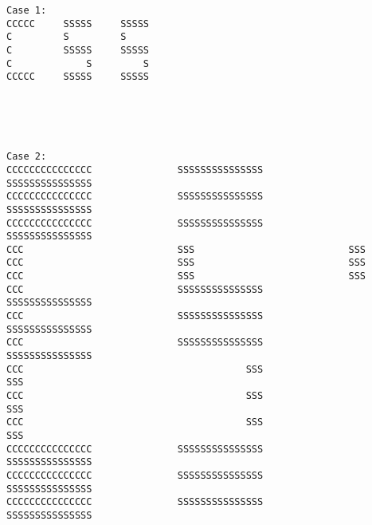 \documentclass{article}
\begin{document}
\begin{verbatim}
Case 1:
CCCCC     SSSSS     SSSSS
C         S         S    
C         SSSSS     SSSSS
C             S         S
CCCCC     SSSSS     SSSSS





Case 2:
CCCCCCCCCCCCCCC               SSSSSSSSSSSSSSS               SSSSSSSSSSSSSSS
CCCCCCCCCCCCCCC               SSSSSSSSSSSSSSS               SSSSSSSSSSSSSSS
CCCCCCCCCCCCCCC               SSSSSSSSSSSSSSS               SSSSSSSSSSSSSSS
CCC                           SSS                           SSS            
CCC                           SSS                           SSS            
CCC                           SSS                           SSS            
CCC                           SSSSSSSSSSSSSSS               SSSSSSSSSSSSSSS
CCC                           SSSSSSSSSSSSSSS               SSSSSSSSSSSSSSS
CCC                           SSSSSSSSSSSSSSS               SSSSSSSSSSSSSSS
CCC                                       SSS                           SSS
CCC                                       SSS                           SSS
CCC                                       SSS                           SSS
CCCCCCCCCCCCCCC               SSSSSSSSSSSSSSS               SSSSSSSSSSSSSSS
CCCCCCCCCCCCCCC               SSSSSSSSSSSSSSS               SSSSSSSSSSSSSSS
CCCCCCCCCCCCCCC               SSSSSSSSSSSSSSS               SSSSSSSSSSSSSSS
\end{verbatim}
\end{document}
